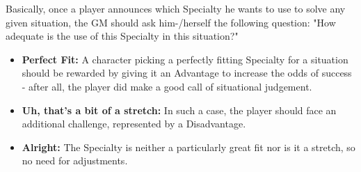 Basically, once a player announces which Specialty he wants to use to solve any given situation, the GM should ask him-/herself the following question: "How adequate is the use of this Specialty in this situation?"
\begin{itemize}
	\item \textbf{Perfect Fit:} A character picking a perfectly fitting Specialty for a situation should be rewarded by giving it an Advantage to increase the odds of success - after all, the player did make a good call of situational judgement.
	\item \textbf{Uh, that's a bit of a stretch:} In such a case, the player should face an additional challenge, represented by a Disadvantage.
	\item \textbf{Alright:} The Specialty is neither a particularly great fit nor is it a stretch, so no need for adjustments.
\end{itemize}


